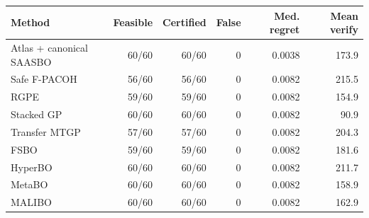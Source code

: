 \begin{tabular}{lrrrrr}
\toprule
Method & Feasible & Certified & False & Med. regret & Mean verify \\
\midrule
Atlas + canonical SAASBO & 60/60 & 60/60 & 0 & 0.0038 & 173.9 \\
Safe F-PACOH & 56/60 & 56/60 & 0 & 0.0082 & 215.5 \\
RGPE & 59/60 & 59/60 & 0 & 0.0082 & 154.9 \\
Stacked GP & 60/60 & 60/60 & 0 & 0.0082 & 90.9 \\
Transfer MTGP & 57/60 & 57/60 & 0 & 0.0082 & 204.3 \\
FSBO & 59/60 & 59/60 & 0 & 0.0082 & 181.6 \\
HyperBO & 60/60 & 60/60 & 0 & 0.0082 & 211.7 \\
MetaBO & 60/60 & 60/60 & 0 & 0.0082 & 158.9 \\
MALIBO & 60/60 & 60/60 & 0 & 0.0082 & 162.9 \\
\bottomrule
\end{tabular}
